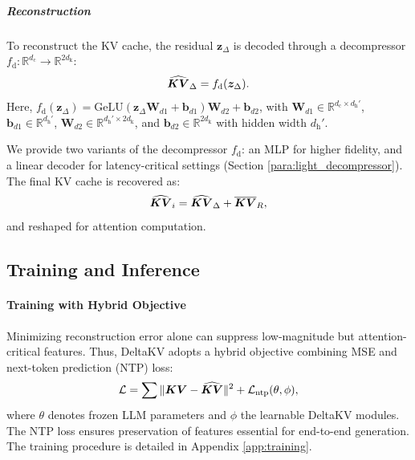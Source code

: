 \vspace{-0.25em}
\subparagraph{Reconstruction} 
To reconstruct the KV cache, the residual $\bm{z}_\Delta$ is decoded through a decompressor $f_\mathrm{d}: \mathbb{R}^{d_\mathrm{c}}\rightarrow \mathbb{R}^{2d_\mathrm{k}}$: 
\vspace{-0.25em}
\begin{displaymath}
  \widehat{\bm{KV}}_\Delta = f_\mathrm{d}(\bm{z}_\Delta). 
  \vspace{-0.25em}
\end{displaymath}
Here, $f_\mathrm{d}(\bm{z}_\Delta) = \mathrm{GeLU}(\bm{z}_\Delta \bm{W}_{d1} + \bm{b}_{d1})\bm{W}_{d2} + \bm{b}_{d2}$, with $\bm{W}_{d1}\in \mathbb{R}^{d_\mathrm{c}\times d_\mathrm{h}'}$, $\bm{b}_{d1}\in \mathbb{R}^{d_\mathrm{h}'}$, $\bm{W}_{d2}\in \mathbb{R}^{d_\mathrm{h}'\times 2d_\mathrm{k}}$, and $\bm{b}_{d2}\in \mathbb{R}^{2d_\mathrm{k}}$ with hidden width $d_\mathrm{h}'$.

We provide two variants of the decompressor $f_\mathrm{d}$: an MLP for higher fidelity, and a linear decoder for latency-critical settings (Section \ref{para:light_decompressor}).
The final KV cache is recovered as:
\vspace{-0.25em}
\begin{displaymath}
  \widehat{\bm{KV}}_i = \widehat{\bm{KV}}_\Delta + \overline{\bm{KV}}_R,
  \vspace{-0.25em}
\end{displaymath}
and reshaped for attention computation.


\subsection{Training and Inference}
\label{sec:method:train-inference}

\paragraph{Training with Hybrid Objective}
Minimizing reconstruction error alone can suppress low-magnitude but attention-critical features.
Thus, DeltaKV adopts a hybrid objective combining MSE and next-token prediction (NTP) loss:
\vspace{-0.25em}
\begin{displaymath}
  \mathcal{L} = \sum {\|\bm{KV} - \widehat{\bm{KV}}\|^2} + {\mathcal{L}_\mathrm{ntp}(\theta, \phi)},
  \vspace{-0.25em}
\end{displaymath}
where $\theta$ denotes frozen LLM parameters and $\phi$ the learnable DeltaKV modules.
The NTP loss ensures preservation of features essential for end-to-end generation. The training procedure is detailed in Appendix \ref{app:training}.

